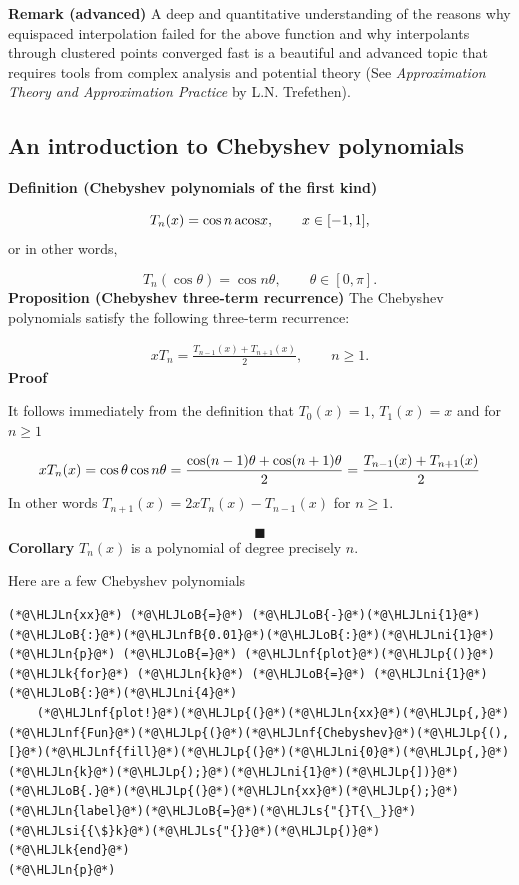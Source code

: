 \documentclass[12pt,a4paper]{article}
\newcommand{\HLJLk}[1]{\textcolor[RGB]{148,91,176}{\textbf{#1}}}
\newcommand{\HLJLn}[1]{#1}
\newcommand{\HLJLnf}[1]{\textcolor[RGB]{66,102,213}{#1}}
\newcommand{\HLJLs}[1]{\textcolor[RGB]{201,61,57}{#1}}
\newcommand{\HLJLsi}[1]{#1}
\newcommand{\HLJLnfB}[1]{\textcolor[RGB]{59,151,46}{#1}}
\newcommand{\HLJLni}[1]{\textcolor[RGB]{59,151,46}{#1}}
\newcommand{\HLJLoB}[1]{\textcolor[RGB]{102,102,102}{\textbf{#1}}}
\newcommand{\HLJLp}[1]{#1}
\begin{document}
\textbf{Remark (advanced)}  A deep and quantitative understanding of the reasons why equispaced interpolation failed for the above function and why interpolants through clustered points converged fast is a beautiful and advanced topic that requires tools from complex analysis and potential theory (See \emph{Approximation Theory and Approximation Practice} by L.N. Trefethen).

\subsection{An introduction to Chebyshev polynomials}
\textbf{Definition (Chebyshev polynomials of the first kind)}

\[
T_n(x) = \cos n\, {\rm acos} x, \qquad x \in [-1, 1],
\]
or in other words,

\[
T_n(\cos \theta) = \cos n \theta, \qquad \theta \in [0, \pi].
\]
\textbf{Proposition (Chebyshev three-term recurrence)}  The Chebyshev polynomials satisfy the following three-term recurrence:


\begin{align*}
xT_{n} = \frac{T_{n-1}(x) + T_{n+1}(x)}{2}, \qquad n \geq 1.
\end{align*}
\textbf{Proof}

It follows immediately from the definition that $T_0(x) = 1$, $T_{1}(x) = x$ and for $n \geq 1$

\[
x T_n(x) = \cos \ensuremath{\theta} \cos n \ensuremath{\theta} = {\cos(n-1)\ensuremath{\theta} + \cos(n+1)\ensuremath{\theta} \over 2} = {T_{n-1}(x) + T_{n+1}(x) \over 2}
\]
In other words $T_{n+1}(x) = 2x T_n(x) - T_{n-1}(x)$ for $n \geq 1$.

\[
\blacksquare
\]
\textbf{Corollary} $T_n(x)$ is a polynomial of degree precisely $n$.

Here are a few Chebyshev polynomials


\begin{lstlisting}
(*@\HLJLn{xx}@*) (*@\HLJLoB{=}@*) (*@\HLJLoB{-}@*)(*@\HLJLni{1}@*)(*@\HLJLoB{:}@*)(*@\HLJLnfB{0.01}@*)(*@\HLJLoB{:}@*)(*@\HLJLni{1}@*)
(*@\HLJLn{p}@*) (*@\HLJLoB{=}@*) (*@\HLJLnf{plot}@*)(*@\HLJLp{()}@*)
(*@\HLJLk{for}@*) (*@\HLJLn{k}@*) (*@\HLJLoB{=}@*) (*@\HLJLni{1}@*)(*@\HLJLoB{:}@*)(*@\HLJLni{4}@*)
    (*@\HLJLnf{plot!}@*)(*@\HLJLp{(}@*)(*@\HLJLn{xx}@*)(*@\HLJLp{,}@*)(*@\HLJLnf{Fun}@*)(*@\HLJLp{(}@*)(*@\HLJLnf{Chebyshev}@*)(*@\HLJLp{(),[}@*)(*@\HLJLnf{fill}@*)(*@\HLJLp{(}@*)(*@\HLJLni{0}@*)(*@\HLJLp{,}@*)(*@\HLJLn{k}@*)(*@\HLJLp{);}@*)(*@\HLJLni{1}@*)(*@\HLJLp{])}@*)(*@\HLJLoB{.}@*)(*@\HLJLp{(}@*)(*@\HLJLn{xx}@*)(*@\HLJLp{);}@*)(*@\HLJLn{label}@*)(*@\HLJLoB{=}@*)(*@\HLJLs{"{}T{\_}}@*)(*@\HLJLsi{{\$}k}@*)(*@\HLJLs{"{}}@*)(*@\HLJLp{)}@*)
(*@\HLJLk{end}@*)
(*@\HLJLn{p}@*)
\end{lstlisting}
\end{document}
